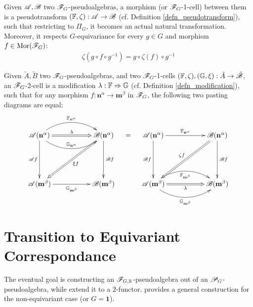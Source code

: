 \documentclass{article}
\begin{document}
\hfil

\begin{defn}[$\F_G$-1-cell]
    Given $\mathscr{A},\mathscr{B}$ two $\F_G$-pseudoalgebras, a morphism (or $\F_G$-1-cell) between them is a pseudotransform $(\mathbb{F},\zeta):\mathscr{A}\rightarrow \mathscr{B}$ (cf. Definition \ref{defn_pseudotransform}), such that restricting to $\Pi_G$, it becomes an actual natural transformation. Moreover, it respects $G$-equivariance for every $g\in G$ and morphism $f\in\mathrm{Mor}(\mathscr{F}_G)$:
    \begin{align*}
        \zeta(g\circ f\circ g^{-1}) = g\circ \zeta(f)\circ g^{-1}
    \end{align*}
\end{defn}

\hfil

\begin{defn}[$\F_G$-2-cell]
    Given $\tilde{A},\tilde{B}$ two $\F_G$-pseudoalgebras, and two $\F_G$-1-cells $(\mathbb{F},\zeta),(\mathbb{G},\xi):\tilde{A}\rightarrow\tilde{\mathscr{B}}$, an $\F_G$-2-cell is a modification $\lambda:\mathbb{F}\Rightarrow\mathbb{G}$ (cf. Definition \ref{defn_modification}), such that for any morphism $f:\mathbf{n}^\alpha\rightarrow\mathbf{m}^\beta$ in $\F_G$, the following two pasting diagrams are equal:
    \begin{align*}
        \xymatrix{
            \A(\mathbf{n}^\alpha) \ar[dd]_-{\A f} \ar@(ur,ul)[rr]^-{\FF_{\mathbf{n}^\alpha}} \ar@{=>}[rr]^-{\lambda} \ar@(dr,dl)[rr]^-{\GG_{\mathbf{n}^\alpha}} && \B(\mathbf{n}^\alpha) \ar[dd]^-{\B f} \ar@{=>}[ddll]^-{\xi f}\\
            \\
            \A(\mathbf{m}^\beta) \ar[rr]_-{\GG_{\mathbf{m}^\beta}} && \B(\mathbf{m}^\beta)
        }\quad = \quad \xymatrix{
            \A(\mathbf{n}^\alpha) \ar[dd]_-{\B f} \ar[rr]^-{\FF_{\mathbf{n}^\alpha}} && \B(\mathbf{n}^\alpha) \ar[dd]^-{\B f} \ar@{=>}[ddll]_-{\zeta f}\\
            \\
            \A(\mathbf{m}^\beta) \ar@(ur,ul)[rr]_-{\FF_{\mathbf{m}^\beta}} \ar@{=>}[rr]_-{\lambda} \ar@(dr,dl)[rr]_-{\GG_{\mathbf{m}^\beta}} && \B(\mathbf{m}^\beta)
        }
    \end{align*}
\end{defn}

\newpage

\section{Transition to Equivariant Correspondance}
The eventual goal is constructing an $\mathscr{F}_{G,\mathbb{R}}$-pseudoalgebra out of an $\mathscr{P}_G$-pseudoalgebra, while extend it to a $2$-functor. \cite{LMRZ26} provides a general construction for the non-equivariant case (or $G=\mathbf{1}$). 
\end{document}
